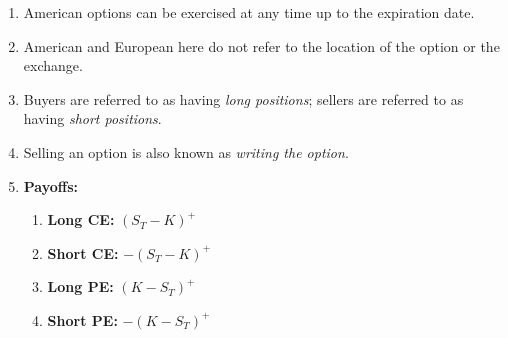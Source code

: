 \begin{enumerate}
\begin{enumerate}
    \end{enumerate}
    \item American options can be exercised at any time up to the expiration date.
    \item American and European here do not refer to the location of the option or the exchange.
    \item Buyers are referred to as having \textit{long positions}; sellers are referred to as having \textit{short positions}. 
    \item Selling an option is also known as \textit{writing the option}.
    \item \textbf{Payoffs:}
    \begin{enumerate}
        \item \textbf{Long CE:} $(S_T - K)^+$
        \item \textbf{Short CE:} $-(S_T - K)^+$
        \item \textbf{Long PE:} $(K - S_T)^+$
        \item \textbf{Short PE:} $-(K - S_T)^+$
    \end{enumerate}






\end{enumerate}
